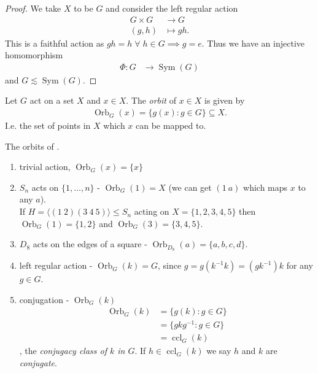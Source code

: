 \begin{proof}
    We take $X$ to be $G$ and consider the left regular action
    \begin{align*}
        G \times G &\to G \\
        (g, h) &\mapsto gh.
    \end{align*} 
    This is a faithful action as $gh = h \; \forall \; h \in G \implies g = e$.
    Thus we have an injective homomorphism 
    \begin{align*}
        \Phi : G &\to \operatorname{Sym}(G)
    \end{align*} and $G \lesssim \operatorname{Sym}(G)$.
\end{proof} 

\begin{definition}[Orbit] \label{def:17}
    Let $G$ act on a set $X$ and $x \in X$.
    The \emph{orbit} of $x \in X$ is given by 
    \begin{align*}
        \operatorname{Orb}_G (x) = \{g(x) : g \in G \} \subseteq X.
    \end{align*} 
    I.e. the set of points in $X$ which $x$ can be mapped to.
\end{definition} 

\begin{example} \mbox{}
    The orbits of .
    \begin{enumerate}
        \item trivial action, $\operatorname{Orb}_G (x) = \{ x \}$
        \item $S_n$ acts on $\{1, \ldots, n\}$ - $\operatorname{Orb}_G(1) = X$ (we can get $(1\ a)$ which maps $x$ to any $a$). \\
        If $H = \langle (1\ 2) (3\ 4\ 5) \rangle \leq S_n$ acting on $X = \{ 1, 2, 3, 4, 5\}$ then $\operatorname{Orb}_G(1) = \{1, 2\}$ and $\operatorname{Orb}_G(3) = \{3, 4, 5\}$.
        \item $D_8$ acts on the edges of a square - $\operatorname{Orb}_{D_8}(a) = \{a, b, c, d\}$.
        \item left regular action - $\operatorname{Orb}_G(k) = G$, since $g = g(k^{-1}k) = (gk^{-1})k$ for any $g \in G$.
        \item conjugation - $\operatorname{Orb}_G(k)$
        \begin{align*}
            \operatorname{Orb}_G(k) &= \{g(k) : g \in G\} \\
            &= \{ gkg^{-1} : g \in G \} \\
            &= \operatorname{ccl}_G(k)
        \end{align*}, the \emph{conjugacy class of $k$ in $G$}. If $h \in \operatorname{ccl}_G(k)$ we say $h$ and $k$ are \emph{conjugate}.
    \end{enumerate} 
\end{example} 

